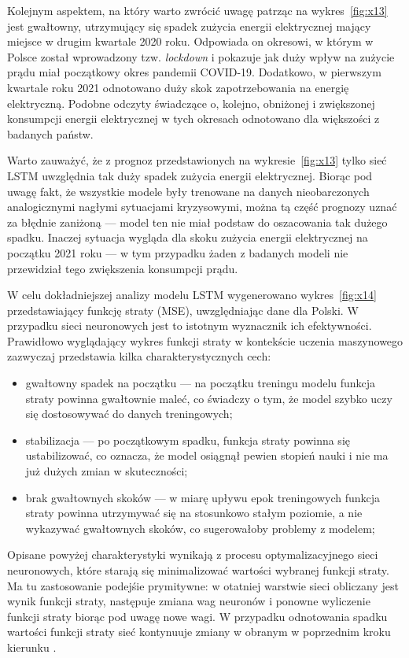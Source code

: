 \documentclass[polish, twoside, 12pt, a4paper]{article}
\theoremstyle{definition}
\theoremstyle{plain}
\theoremstyle{remark}
\begin{document}
Kolejnym aspektem, na który warto zwrócić uwagę patrząc na wykres~\ref{fig:x13} jest gwałtowny, utrzymujący się spadek zużycia energii elektrycznej mający miejsce w drugim kwartale 2020 roku. Odpowiada on okresowi, w którym w Polsce został wprowadzony tzw. \textit{lockdown} i pokazuje jak duży wpływ na zużycie prądu miał początkowy okres pandemii COVID-19. Dodatkowo, w pierwszym kwartale roku 2021 odnotowano duży skok zapotrzebowania na energię elektryczną. Podobne odczyty świadczące o, kolejno, obniżonej i zwiększonej konsumpcji energii elektrycznej w tych okresach odnotowano dla większości z badanych państw. 

Warto zauważyć, że z prognoz przedstawionych na wykresie~\ref{fig:x13} tylko sieć LSTM uwzględnia tak duży spadek zużycia energii elektrycznej. Biorąc pod uwagę fakt, że wszystkie modele były trenowane na danych nieobarczonych analogicznymi nagłymi sytuacjami kryzysowymi, można tą część prognozy uznać za błędnie zaniżoną --- model ten nie miał podstaw do oszacowania tak dużego spadku. Inaczej sytuacja wygląda dla skoku zużycia energii elektrycznej na początku 2021 roku --- w tym przypadku żaden z badanych modeli nie przewidział tego zwiększenia konsumpcji prądu.

W celu dokładniejszej analizy modelu LSTM wygenerowano wykres~\ref{fig:x14} przedstawiający funkcję straty (MSE), uwzględniając dane dla Polski. W przypadku sieci neuronowych jest to istotnym wyznacznik ich efektywności. Prawidłowo wyglądający wykres funkcji straty w kontekście uczenia maszynowego zazwyczaj przedstawia kilka charakterystycznych cech:

\begin{itemize}[noitemsep]
	\item gwałtowny spadek na początku --- na początku treningu modelu funkcja straty powinna gwałtownie maleć, co świadczy o tym, że model szybko uczy się dostosowywać do danych treningowych;
	\item stabilizacja --- po początkowym spadku, funkcja straty powinna się ustabilizować, co oznacza, że model osiągnął pewien stopień nauki i nie ma już dużych zmian w skuteczności;
	\item brak gwałtownych skoków --- w miarę upływu epok treningowych funkcja straty powinna utrzymywać się na stosunkowo stałym poziomie, a nie wykazywać gwałtownych skoków, co sugerowałoby problemy z modelem;
\end{itemize}
Opisane powyżej charakterystyki wynikają z procesu optymalizacyjnego sieci neuronowych, które starają się minimalizować wartości wybranej funkcji straty. Ma tu zastosowanie podejśie prymitywne: w otatniej warstwie sieci obliczany jest wynik funkcji straty, następuje zmiana wag neuronów i ponowne wyliczenie funkcji straty biorąc pod uwagę nowe wagi. W przypadku odnotowania spadku wartości funkcji straty sieć kontynuuje zmiany w obranym w poprzednim kroku kierunku \citep{brzezinski2021}. 
\end{document}
